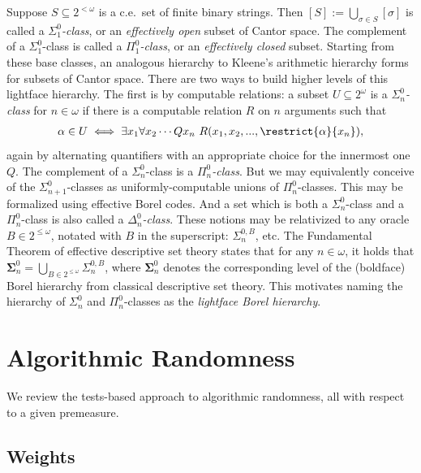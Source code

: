 Suppose $S \subseteq 2^{<\omega}$ is a c.e.~set of finite binary strings. Then $[S] := \bigcup_{\sigma \in S}[\sigma]$ is called a \textit{$\Sigma^0_1$-class}, or an \textit{effectively open} subset of Cantor space. The complement of a $\Sigma^0_1$-class is called a \textit{$\Pi^0_1$-class}, or an \textit{effectively closed} subset. Starting from these base classes, an analogous hierarchy to Kleene's arithmetic hierarchy forms for subsets of Cantor space. There are two ways to build higher levels of this lightface hierarchy. The first is by computable relations: a subset $U \subseteq 2^\omega$ is a \textit{$\Sigma^0_n$-class} for $n \in \omega$ if there is a computable relation $R$ on $n$ arguments such that
\begin{align*}
    \alpha \in U \iff \exists x_1 \forall x_2 \cdots Q x_n\ R(x_1, x_2, ..., \restrict{\alpha}{x_n}),
\end{align*}
again by alternating quantifiers with an appropriate choice for the innermost one $Q$. The complement of a $\Sigma^0_n$-class is a \textit{$\Pi^0_n$-class}. But we may equivalently conceive of the $\Sigma^0_{n + 1}$-classes as uniformly-computable unions of $\Pi^0_n$-classes. This may be formalized using effective Borel codes. And a set which is both a $\Sigma^0_n$-class and a $\Pi^0_n$-class is also called a \textit{$\Delta^0_n$-class}. These notions may be relativized to any oracle $B \in 2^{\leq \omega}$, notated with $B$ in the superscript: $\Sigma^{0, B}_n$, etc. The Fundamental Theorem of effective descriptive set theory states that for any $n \in \omega$, it holds that $\boldsymbol{\Sigma}^0_n = \bigcup_{B \in 2^{\leq \omega}} \Sigma^{0, B}_n$, where $\boldsymbol{\Sigma}^0_n$ denotes the corresponding level of the (boldface) Borel hierarchy from classical descriptive set theory. This motivates naming the hierarchy of $\Sigma^0_n$ and $\Pi^0_n$-classes as the \textit{lightface Borel hierarchy}. 

\section{Algorithmic Randomness} \label{section:Algorithmic_Randomness}
We review the tests-based approach to algorithmic randomness, all with respect to a given premeasure.

\subsection{Weights}

